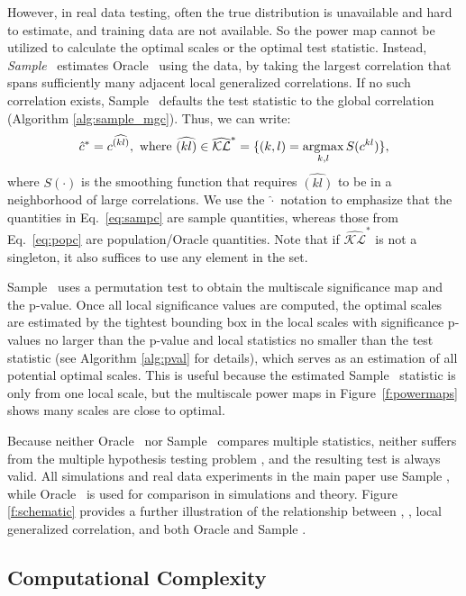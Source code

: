 \documentclass[11pt]{article}
\begin{document}
However, in real data testing, often the true distribution is unavailable and hard to estimate, and training data are not available. 
So the power map cannot be utilized to calculate the optimal scales or the optimal test statistic.
Instead, \emph{Sample} \Mgc~estimates Oracle \Mgc~using the data, by taking the largest correlation that spans sufficiently many adjacent local generalized correlations. 
If no such correlation exists, Sample \Mgc~defaults the test statistic to the global correlation (Algorithm \ref{alg:sample_mgc}).
Thus, we can write:
\begin{equation} \label{eq:sampc}
\hat{\GG}^{*} =  c^{\widehat{(kl)}}, \text{ where } \widehat{(kl)} \in \widehat{\mathcal{KL}}^*  =\{(k,l)=\argmax_{k,l}S(\GG^{kl})\},
\end{equation}
where $S(\cdot)$ is the smoothing function that requires $\widehat{(kl)}$ to be in a neighborhood of large correlations. We use the $\hat{\cdot}$ notation to emphasize that the quantities in Eq.~\ref{eq:sampc} are sample quantities, whereas those from Eq.~\ref{eq:popc} are population/Oracle quantities. Note that if $\widehat{\mathcal{KL}}^*$ is not a singleton, it also suffices to use any element in the set.

Sample \Mgc~uses a permutation test to obtain the multiscale significance map and the p-value. 
% 
Once all local significance values are computed, the optimal scales are estimated by the tightest bounding box in the local scales with significance p-values no larger than the p-value and local statistics no smaller than the test statistic (see Algorithm \ref{alg:pval} for details), which serves as an estimation of all potential optimal scales. This is useful because the estimated Sample \Mgc~statistic is only from one local scale, but the multiscale power maps in Figure~\ref{f:powermaps}  shows many scales are close to optimal.

Because neither  Oracle \Mgc~nor Sample \Mgc~compares multiple statistics, neither suffers from the multiple hypothesis testing problem \cite{Benjamini1995}, and the resulting test is always valid. All simulations and real data experiments in the main paper use Sample \Mgc,  while Oracle \Mgc~is used for comparison in simulations and theory. Figure \ref{f:schematic} provides a further illustration of the relationship between \Mantel, \Mcorr, local generalized correlation, and both Oracle and Sample \Mgc.

\subsection{Computational Complexity}
\end{document}
